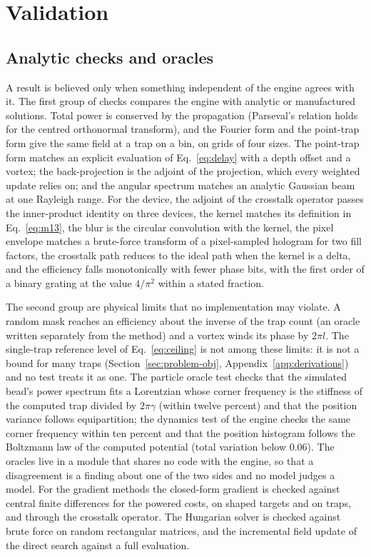 
\section{Validation}\label{sec:validation}

\subsection{Analytic checks and oracles}\label{sec:validation-oracles}

A result is believed only when something independent of the engine agrees with it. The first group of checks compares the engine with analytic or manufactured solutions. Total power is conserved by the propagation (Parseval's relation holds for the centred orthonormal transform), and the Fourier form and the point-trap form give the same field at a trap on a bin, on grids of four sizes. The point-trap form matches an explicit evaluation of Eq.~\eqref{eq:delay} with a depth offset and a vortex; the back-projection is the adjoint of the projection, which every weighted update relies on; and the angular spectrum matches an analytic Gaussian beam at one Rayleigh range. For the device, the adjoint of the crosstalk operator passes the inner-product identity on three devices, the kernel matches its definition in Eq.~\eqref{eq:m13}, the blur is the circular convolution with the kernel, the pixel envelope matches a brute-force transform of a pixel-sampled hologram for two fill factors, the crosstalk path reduces to the ideal path when the kernel is a delta, and the efficiency falls monotonically with fewer phase bits, with the first order of a binary grating at the value $4/\pi^2$ within a stated fraction.

The second group are physical limits that no implementation may violate. A random mask reaches an efficiency about the inverse of the trap count (an oracle written separately from the method) and a vortex winds its phase by $2\pi l$. The single-trap reference level of Eq.~\eqref{eq:ceiling} is not among these limits: it is not a bound for many traps (Section~\ref{sec:problem-obj}, Appendix~\ref{app:derivations}) and no test treats it as one. The particle oracle test checks that the simulated bead's power spectrum fits a Lorentzian whose corner frequency is the stiffness of the computed trap divided by $2\pi\gamma$ (within twelve percent) and that the position variance follows equipartition; the dynamics test of the engine checks the same corner frequency within ten percent and that the position histogram follows the Boltzmann law of the computed potential (total variation below 0.06). The oracles live in a module that shares no code with the engine, so that a disagreement is a finding about one of the two sides and no model judges a model. For the gradient methods the closed-form gradient is checked against central finite differences for the powered costs, on shaped targets and on traps, and through the crosstalk operator. The Hungarian solver is checked against brute force on random rectangular matrices, and the incremental field update of the direct search against a full evaluation.

